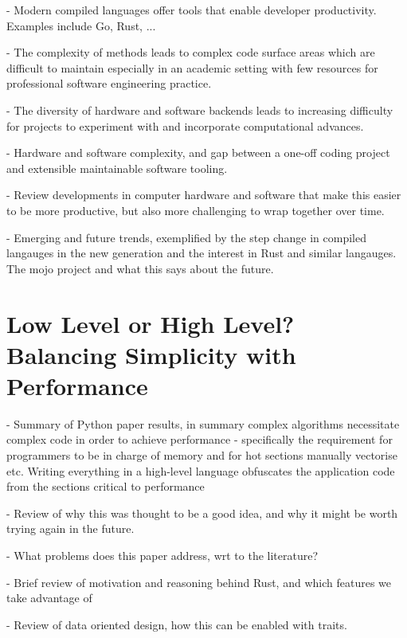 - Modern compiled languages offer tools that enable developer productivity. Examples include Go, Rust, ...

- The complexity of methods leads to complex code surface areas which are difficult to maintain especially in an academic setting with few resources for professional software engineering practice.

- The diversity of hardware and software backends leads to increasing difficulty for projects to experiment with and incorporate computational advances.

- Hardware and software complexity, and gap between a one-off coding project and extensible maintainable software tooling.

- Review developments in computer hardware and software that make this easier to be more productive, but also more challenging to wrap together over time.

- Emerging and future trends, exemplified by the step change in compiled langauges in the new generation and the interest in Rust and similar langauges. The mojo project and what this says about the future.


\section{Low Level or High Level? Balancing Simplicity with Performance}

- Summary of Python paper results, in summary complex algorithms necessitate complex code in order to achieve performance - specifically the requirement for programmers to be in charge of memory and for hot sections manually vectorise etc. Writing everything in a high-level language obfuscates the application code from the sections critical to performance

- Review of why this was thought to be a good idea, and why it might be worth trying again in the future.

- What problems does this paper address, wrt to the literature?

- Brief review of motivation and reasoning behind Rust, and which features we take advantage of

- Review of data oriented design, how this can be enabled with traits.

% 
% 
% 
% 
